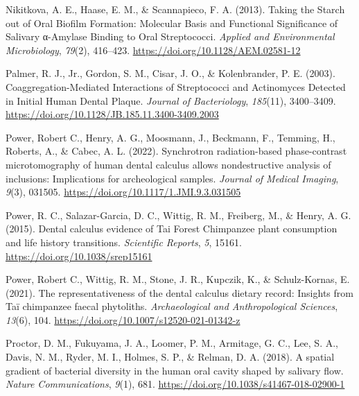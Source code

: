 \documentclass[
  letterpaper,
]{book}
\newlength{\cslhangindent}
\newlength{\cslentryspacingunit} %
\newenvironment{CSLReferences}[2] %
 {%
  \setlength{\parindent}{0pt}
  \ifodd #1
  \let\oldpar\par
  \def\par{\hangindent=\cslhangindent\oldpar}
  \fi
  \setlength{\parskip}{#2\cslentryspacingunit}
 }%
 {}
\begin{document}
\begin{CSLReferences}{1}{0}
\leavevmode{}%
Nikitkova, A. E., Haase, E. M., \& Scannapieco, F. A. (2013). Taking the
{Starch} out of {Oral Biofilm Formation}: {Molecular Basis} and
{Functional Significance} of {Salivary} α-{Amylase Binding} to {Oral
Streptococci}. \emph{Applied and Environmental Microbiology},
\emph{79}(2), 416--423. \url{https://doi.org/10.1128/AEM.02581-12}

\leavevmode{}%
Palmer, R. J., Jr., Gordon, S. M., Cisar, J. O., \& Kolenbrander, P. E.
(2003). Coaggregation-{Mediated Interactions} of {Streptococci} and
{Actinomyces Detected} in {Initial Human Dental Plaque}. \emph{Journal
of Bacteriology}, \emph{185}(11), 3400--3409.
\url{https://doi.org/10.1128/JB.185.11.3400-3409.2003}

\leavevmode{}%
Power, Robert C., Henry, A. G., Moosmann, J., Beckmann, F., Temming, H.,
Roberts, A., \& Cabec, A. L. (2022). Synchrotron radiation-based
phase-contrast microtomography of human dental calculus allows
nondestructive analysis of inclusions: Implications for archeological
samples. \emph{Journal of Medical Imaging}, \emph{9}(3), 031505.
\url{https://doi.org/10.1117/1.JMI.9.3.031505}

\leavevmode{}%
Power, R. C., Salazar-Garcia, D. C., Wittig, R. M., Freiberg, M., \&
Henry, A. G. (2015). Dental calculus evidence of {Tai Forest Chimpanzee}
plant consumption and life history transitions. \emph{Scientific
Reports}, \emph{5}, 15161. \url{https://doi.org/10.1038/srep15161}

\leavevmode{}%
Power, Robert C., Wittig, R. M., Stone, J. R., Kupczik, K., \&
Schulz-Kornas, E. (2021). The representativeness of the dental calculus
dietary record: Insights from {Taï} chimpanzee faecal phytoliths.
\emph{Archaeological and Anthropological Sciences}, \emph{13}(6), 104.
\url{https://doi.org/10.1007/s12520-021-01342-z}

\leavevmode{}%
Proctor, D. M., Fukuyama, J. A., Loomer, P. M., Armitage, G. C., Lee, S.
A., Davis, N. M., Ryder, M. I., Holmes, S. P., \& Relman, D. A. (2018).
A spatial gradient of bacterial diversity in the human oral cavity
shaped by salivary flow. \emph{Nature Communications}, \emph{9}(1), 681.
\url{https://doi.org/10.1038/s41467-018-02900-1}


\end{CSLReferences}
\end{document}
